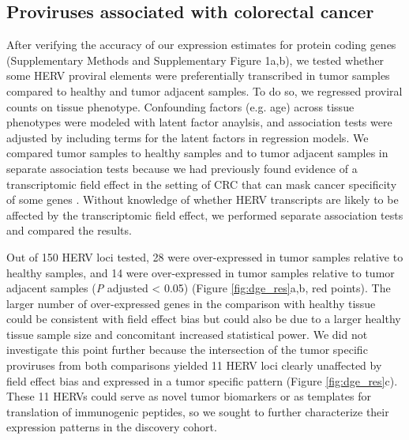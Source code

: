 \subsection*{Proviruses associated with colorectal cancer}
After verifying the accuracy of our expression estimates for protein coding genes (Supplementary Methods and Supplementary Figure 1a,b), we tested whether some HERV proviral elements were preferentially transcribed in tumor samples compared to healthy and tumor adjacent samples.
To do so, we regressed proviral counts on tissue phenotype.
Confounding factors (e.g. age) across tissue phenotypes were modeled with latent factor anaylsis, and association tests were adjusted by including terms for the latent factors in regression models.
We compared tumor samples to healthy samples and to tumor adjacent samples in separate association tests because we had previously found evidence of a transcriptomic field effect in the setting of CRC that can mask cancer specificity of some genes \citep{Dampier2020}.
Without knowledge of whether HERV transcripts are likely to be affected by the transcriptomic field effect, we performed separate association tests and compared the results.

Out of 150 HERV loci tested, 28 were over-expressed in tumor samples relative to healthy samples, and 14 were over-expressed in tumor samples relative to tumor adjacent samples (\emph{P} adjusted < 0.05) (Figure \ref{fig:dge_res}a,b, red points).
The larger number of over-expressed genes in the comparison with healthy tissue could be consistent with field effect bias but could also be due to a larger healthy tissue sample size and concomitant increased statistical power.
We did not investigate this point further because the intersection of the tumor specific proviruses from both comparisons yielded 11 HERV loci clearly unaffected by field effect bias and expressed in a tumor specific pattern (Figure \ref{fig:dge_res}c).
These 11 HERVs could serve as novel tumor biomarkers or as templates for translation of immunogenic peptides, so we sought to further characterize their expression patterns in the discovery cohort.

